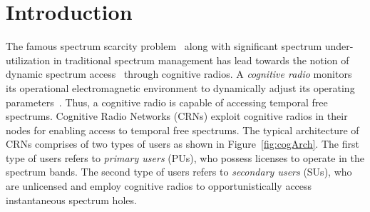 \chapter{Introduction}\label{intro}
The famous spectrum scarcity problem~\cite{valenta2010survey} along with significant spectrum under-utilization in traditional spectrum management has lead towards the notion of dynamic spectrum access~\cite{akyildiz2006next} through cognitive radios. A \textit{cognitive radio} monitors its operational electromagnetic environment to dynamically adjust its operating parameters~\cite{Mitola}. Thus, a cognitive radio is capable of accessing temporal free spectrums. Cognitive Radio Networks (CRNs) exploit cognitive radios in their nodes for enabling access to temporal free spectrums. The typical architecture of CRNs comprises of two types of users as shown in Figure~\ref{fig:cogArch}. The first type of users refers to \textit{primary users} (PUs), who possess licenses to operate in the spectrum bands. The second type of users refers to \textit{secondary users} (SUs), who are unlicensed and employ cognitive radios to opportunistically access instantaneous spectrum holes.

